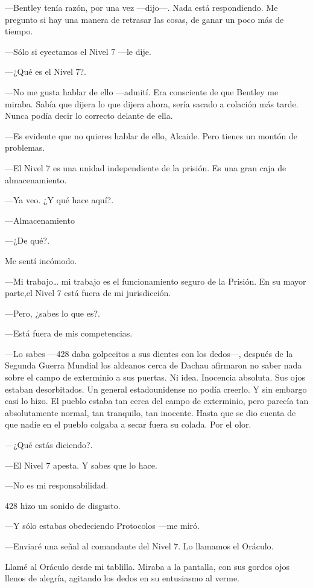 ---Bentley tenía razón, por una vez ---dijo---. Nada está respondiendo.
Me pregunto si hay una manera de retrasar las cosas, de ganar un poco
más de tiempo.

---Sólo si eyectamos el Nivel 7 ---le dije.

---¿Qué es el Nivel 7?.

---No me gusta hablar de ello ---admití. Era consciente de que Bentley
me miraba. Sabía que dijera lo que dijera ahora, sería sacado a colación
más tarde. Nunca podía decir lo correcto delante de ella.

---Es evidente que no quieres hablar de ello, Alcaide. Pero tienes un
montón de problemas.

---El Nivel 7 es una unidad independiente de la prisión. Es una gran
caja de almacenamiento.

---Ya veo. ¿Y qué hace aquí?.

---Almacenamiento

---¿De qué?.

Me sentí incómodo.

---Mi trabajo\ldots{} mi trabajo es el funcionamiento seguro de la
Prisión. En su mayor parte,el Nivel 7 está fuera de mi jurisdicción.

---Pero, ¿sabes lo que es?.

---Está fuera de mis competencias.

---Lo sabes ---428 daba golpecitos a sus dientes con los dedos---,
después de la Segunda Guerra Mundial los aldeanos cerca de Dachau
afirmaron no saber nada sobre el campo de exterminio a sus puertas. Ni
idea. Inocencia absoluta. Sus ojos estaban desorbitados. Un general
estadounidense no podía creerlo. Y sin embargo casi lo hizo. El pueblo
estaba tan cerca del campo de exterminio, pero parecía tan absolutamente
normal, tan tranquilo, tan inocente. Hasta que se dio cuenta de que
nadie en el pueblo colgaba a secar fuera su colada. Por el olor.

---¿Qué estás diciendo?.

---El Nivel 7 apesta. Y sabes que lo hace.

---No es mi responsabilidad.

428 hizo un sonido de disgusto.

---Y sólo estabas obedeciendo Protocolos ---me miró.

---Enviaré una señal al comandante del Nivel 7. Lo llamamos el Oráculo.

Llamé al Oráculo desde mi tablilla. Miraba a la pantalla, con sus gordos
ojos llenos de alegría, agitando los dedos en su entusiasmo al verme.

